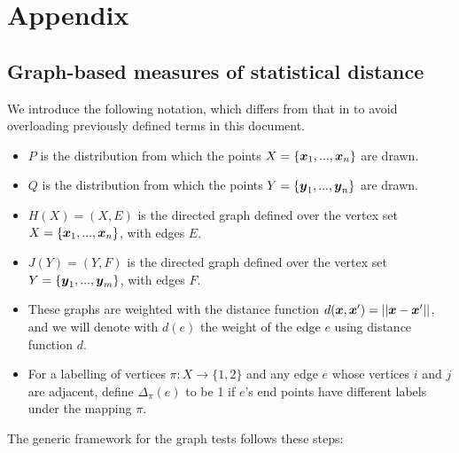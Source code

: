 \chapter{Appendix}

\section{Graph-based measures of statistical distance}
\label{appendix:graphbased}
We introduce the following notation, which differs from that in \cite{torchtwosample} to avoid overloading previously defined terms in this document. 

\begin{itemize}
    \item $P$ is the distribution from which the points $X = \{\boldsymbol{x}_1, ..., \boldsymbol{x}_n \}$ are drawn.
    \item $Q$ is the distribution from which the points $Y = \{\boldsymbol{y}_1, ..., \boldsymbol{y}_n \}$ are drawn.
    \item $H(X) = (X, E)$ is the directed graph defined over the vertex set $X = \{\boldsymbol{x}_1, ..., \boldsymbol{x}_n \}$, with edges $E$.
    \item $J(Y) = (Y, F) $ is the directed graph defined over the vertex set $Y = \{\boldsymbol{y}_1, ..., \boldsymbol{y}_m \}$, with edges $F$. 
    \item These graphs are weighted with the distance function $d(\boldsymbol{x}, \boldsymbol{x}') = || \boldsymbol{x} - \boldsymbol{x}'||$, and we will denote with $d(e)$ the weight of the edge $e$ using distance function $d$. 
    \item For a labelling of vertices $\pi: X \rightarrow \{1, 2\}$ and any edge $e$ whose vertices $i$ and $j$ are adjacent, define $\Delta_{\pi}(e)$ to be 1 if $e$'s end points have different labels under the mapping $\pi$. 
\end{itemize}

The generic framework for the graph tests follows these steps:

